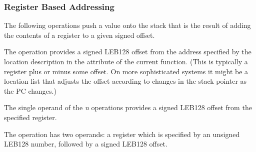 \subsubsection{Register Based Addressing}
\label{chap:registerbasedaddressing}
The following operations push a value onto the stack that is
the result of adding the contents of a register to a given
signed offset.
\begin{enumerate}[1. ]
The  operation provides a signed LEB128 offset
from the address specified by the location description in the
 attribute of the current function. (This
is typically a  register plus or minus
some offset. On more sophisticated systems it might be a
location list that adjusts the offset according to changes
in the stack pointer as the PC changes.)

The single operand of the \textit{n} 
operations provides
a signed LEB128 offset from
the specified register.

The  operation has two operands: a register
which is specified by an unsigned LEB128 number, followed by
a signed LEB128 offset.

\end{enumerate}


